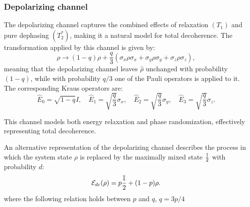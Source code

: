 \subsubsection{Depolarizing channel}
The depolarizing channel captures the combined effects of relaxation $(T_1)$ and pure dephasing $(T_2^*)$, making it a natural model for total decoherence. The transformation applied by this channel is given by:
\begin{equation}
    \rho \rightarrow (1 - q) \rho + \frac{q}{3} (\sigma_x \rho \sigma_x + \sigma_y \rho \sigma_y + \sigma_z \rho \sigma_z),
\end{equation}
meaning that the depolarizing channel leaves  $\hat{\rho}$ unchanged with probability $(1-q)$, while with probability $q/3$ one of the Pauli operators is applied to it.
The corresponding Kraus operators are:
\begin{equation}
    \hat{E}_0 = \sqrt{1 - q} I, \quad
    \hat{E}_1 = \sqrt{\frac{q}{3}} \sigma_x, \quad
    \hat{E}_2 = \sqrt{\frac{q}{3}} \sigma_y, \quad
    \hat{E}_3 = \sqrt{\frac{q}{3}} \sigma_z.
\end{equation}

This channel models both energy relaxation and phase randomization, effectively representing total decoherence.

An alternative representation of the depolarizing channel describes the process in which the system state $\rho$ is replaced by the maximally mixed state $\frac{\mathbb{I}}{2}$ with probability $d$:
\begin{equation}\label{eq:depolarizing_channel}
    \mathcal{E}_{dc}(\rho) = p\frac{\mathbb{I}}{2}+(1-p)\rho.
\end{equation}
where the following relation holds between  $p$ and $q$, $q=3p/4$
